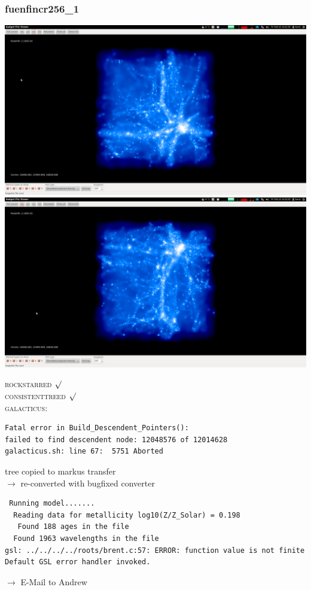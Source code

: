 \documentclass[a4paper,11pt,fleqn,oneside]{book}
\begin{document}
\newpage
\subsubsection{fuenfincr256\_1}

\includegraphics[scale=0.12]{fuenfincr256_1/1.png} 
\includegraphics[scale=0.12]{fuenfincr256_1/2.png}

\textsc{rockstarred} $\surd$ \\ \textsc{consistenttreed} $\surd$
\\ \textsc{galacticus}: 
\begin{verbatim}
Fatal error in Build_Descendent_Pointers():
failed to find descendent node: 12048576 of 12014628
galacticus.sh: line 67:  5751 Aborted  
\end{verbatim}
tree copied to markus transfer \\
$\rightarrow$ re-converted with bugfixed converter \\
\begin{verbatim}
 Running model....... 
  Reading data for metallicity log10(Z/Z_Solar) = 0.198
   Found 188 ages in the file
  Found 1963 wavelengths in the file
gsl: ../../../../roots/brent.c:57: ERROR: function value is not finite
Default GSL error handler invoked.
\end{verbatim}
$\rightarrow$ E-Mail to Andrew \\
\end{document}
